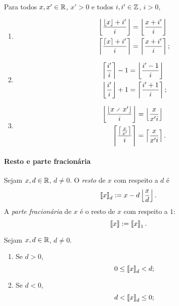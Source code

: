 \begin{exercise}
Para todos $x,x' \in \mathbb{R}$, $x'>0$ e todos $i,i' \in \mathbb{Z}$, $i>0$,
	\begin{enumerate}
	\item
		\begin{align*}
		\left\lfloor{\frac{\left\lfloor{x}\right\rfloor+i'}{i}}\right\rfloor &= \left\lfloor{\frac{x+i'}{i}}\right\rfloor \\
		\left\lceil{\frac{\left\lceil{x}\right\rceil+i'}{i}}\right\rceil &= \left\lceil{\frac{x+i'}{i}}\right\rceil;
		\end{align*}

	\item
		\begin{align*}
		\left\lceil{\frac{i'}{i}}\right\rceil - 1 &= \left\lfloor{\frac{i'-1}{i}}\right\rfloor \\
		\left\lfloor{\frac{i'}{i}}\right\rfloor + 1 &= \left\lceil{\frac{i'+1}{i}}\right\rceil;
		\end{align*}

	\item
		\begin{align*}
		\chao{\frac{\chao{x \div x'}}{i}} &= \chao{\frac{x}{x'i}} \\
		\teto{\frac{\teto{\frac{x}{x'}}}{i}} &= \teto{\frac{x}{x'i}}.
		\end{align*}

	\end{enumerate}
\end{exercise}




\paragraph{Resto e parte fracionária}

\begin{definition}
Sejam $x,d \in \mathbb{R}$, $d \neq 0$. O \emph{resto} de $x$ com respeito a $d$ é
	\begin{equation*}
	\left\llbracket{x}\right\rrbracket_{d} := x - d\left\lfloor{\frac{x}{d}}\right\rfloor.
	\end{equation*}
A \emph{parte fracionária} de $x$ é o resto de $x$ com respeito a $1$:
	\begin{equation*}
	\left\llbracket{x}\right\rrbracket := \left\llbracket{x}\right\rrbracket_{1}.
	\end{equation*}
\end{definition}

\begin{exercise}
Sejam $x,d \in \mathbb{R}$, $d \neq 0$.
	\begin{enumerate}
	\item Se $d>0$,
		\begin{equation*}
		0 \leq \left\llbracket{x}\right\rrbracket_{d} < d;
		\end{equation*}

	\item Se $d<0$,
		\begin{equation*}
		d < \left\llbracket{x}\right\rrbracket_{d} \leq 0;
		\end{equation*}
	\end{enumerate}
\end{exercise}





